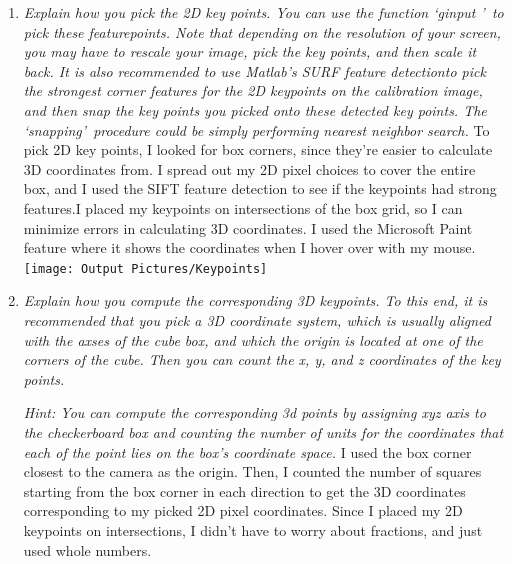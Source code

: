 \documentclass[11pt]{article}
\begin{document}
    \begin{enumerate}
        \item \textit{Explain how you pick the 2D key points. You can use the function \textquoteleft ginput
        \textquoteright\ to pick these featurepoints. Note that depending on the resolution of your screen, you may
        have to rescale your image, pick the key points, and then scale it back. It is also recommended to use Matlab’s
        SURF feature detectionto pick the strongest corner features for the 2D keypoints on the calibration image, and
        then snap the key points you picked onto these detected key points. The \textquoteleft snapping\textquoteright\
            procedure could be simply performing nearest neighbor search.}\newline
        To pick 2D key points, I looked for box corners, since they're easier to calculate 3D coordinates from. I
        spread out my 2D pixel choices to cover the entire box, and I used the SIFT feature detection to see if the
        keypoints had strong features.I placed my keypoints on intersections of the box grid, so I can minimize
        errors in calculating 3D coordinates. I used the Microsoft Paint feature where it shows the coordinates when
        I hover over with my mouse.\newline
        \texttt{[image: Output Pictures/Keypoints]}\newline

        \item \textit{Explain how you compute the corresponding 3D keypoints. To this end, it is recommended that you
        pick a 3D coordinate system, which is usually aligned with the axses of the cube box, and which the origin is
        located at one of the corners of the cube. Then you can count the x, y, and z coordinates of the key points.}
        \par
        \textit{Hint: You can compute the corresponding 3d points by assigning xyz axis to the checkerboard box and
        counting the number of units for the coordinates that each of the point lies on the box’s coordinate space.}\newline
        I used the box corner closest to the camera as the origin.\newline
        Then, I counted the number of squares starting from the box corner in each direction to get the 3D
        coordinates corresponding to my picked 2D pixel coordinates. Since I placed my 2D keypoints on
        intersections, I didn't have to worry about fractions, and just used whole numbers.\newline


\end{enumerate}
\end{document}
